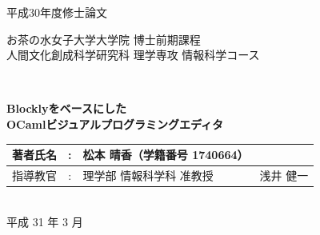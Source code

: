 
\begin{titlepage}
{\Large 平成30年度修士論文}\\

\setlength{\baselineskip}{13mm}
\parbox{\hsize}{
\vspace*{10mm}
\hspace*{\fill}
{\Large お茶の水女子大学大学院 博士前期課程
\vspace*{3mm}
\hspace*{\fill}\\\hspace*{\fill}
人間文化創成科学研究科 理学専攻 情報科学コース\hspace*{\fill}}}\\
\vspace*{8mm}

\begin{center}
  \textbf{
    \huge \textbf{Blocklyをベースにした\\OCamlビジュアルプログラミングエディタ}}
  \vspace*{20mm}
  
  \begin{figure}[h]
    \begin{center}
    \end{center}
  \end{figure}
  \vspace*{20mm}
  
  {\LARGE
    \begin{tabular}{@{}lcl@{\quad}l}
      著者氏名 & : & 松本 晴香（学籍番号 1740664）\\[-1mm] \hline
      指導教官 & : & 理学部 情報科学科 准教授  & 浅井 健一\\[-1mm] \hline
    \end{tabular}
  }\\
  \vspace*{18mm}
  {\LARGE 平成 31 年 3 月}
\end{center}

\end{titlepage}
